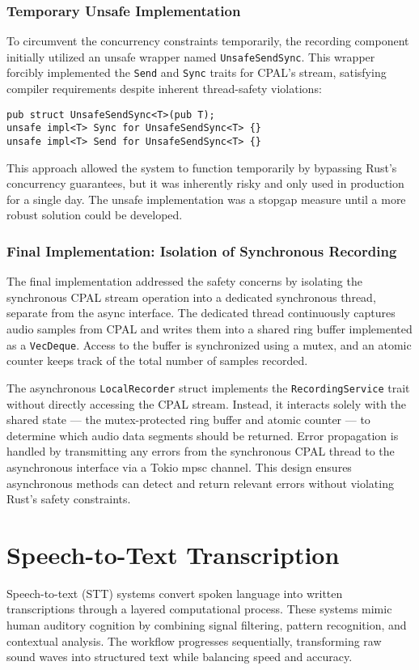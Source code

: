 \subsubsection{Temporary Unsafe Implementation}
To circumvent the concurrency constraints temporarily, the recording component initially utilized an unsafe wrapper named \texttt{UnsafeSendSync}.
This wrapper forcibly implemented the \texttt{Send} and \texttt{Sync} traits for CPAL's stream, satisfying compiler requirements despite inherent thread-safety violations:

\begin{verbatim}
pub struct UnsafeSendSync<T>(pub T);
unsafe impl<T> Sync for UnsafeSendSync<T> {}
unsafe impl<T> Send for UnsafeSendSync<T> {}
\end{verbatim}

This approach allowed the system to function temporarily by bypassing Rust's concurrency guarantees, but it was inherently risky and only used in production for a single day.
The unsafe implementation was a stopgap measure until a more robust solution could be developed.

\subsubsection{Final Implementation: Isolation of Synchronous Recording}
The final implementation addressed the safety concerns by isolating the synchronous CPAL stream operation into a dedicated synchronous thread, separate from the async interface.
The dedicated thread continuously captures audio samples from CPAL and writes them into a shared ring buffer implemented as a \texttt{VecDeque}.
Access to the buffer is synchronized using a mutex, and an atomic counter keeps track of the total number of samples recorded.

The asynchronous \texttt{LocalRecorder} struct implements the \texttt{RecordingService} trait without directly accessing the CPAL stream.
Instead, it interacts solely with the shared state --- the mutex-protected ring buffer and atomic counter --- to determine which audio data segments should be returned.
Error propagation is handled by transmitting any errors from the synchronous CPAL thread to the asynchronous interface via a Tokio mpsc channel.
This design ensures asynchronous methods can detect and return relevant errors without violating Rust's safety constraints.

\section{Speech-to-Text Transcription}
Speech-to-text (STT) systems convert spoken language into written transcriptions through a layered computational process.
These systems mimic human auditory cognition by combining signal filtering, pattern recognition, and contextual analysis.
The workflow progresses sequentially, transforming raw sound waves into structured text while balancing speed and accuracy.

